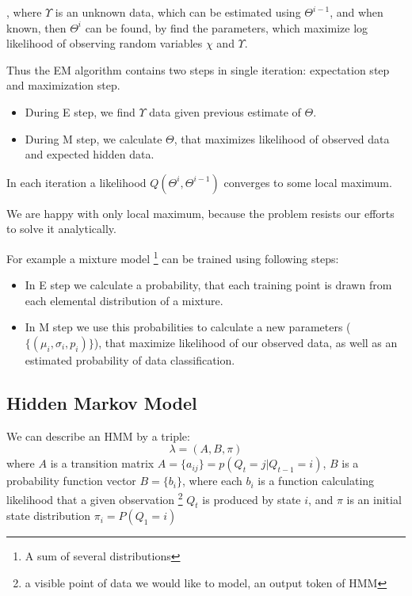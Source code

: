 \documentclass[12pt,a4paper,english]{article}
\begin{document}
 , where $\Upsilon$ is an unknown data, which can be estimated using $\Theta^{i-1}$, and when known, then $\Theta^{i}$ can be found, by find the parameters, which maximize log likelihood of observing random variables $\chi$ and $\Upsilon$. \newline


Thus the EM algorithm contains two steps in single iteration: \newline
    expectation step and maximization step. \newline
\begin{itemize}
	\item During E step, we find $\Upsilon$ data given previous estimate of $\Theta$.
	\item During M step, we calculate $\Theta$, that maximizes likelihood of observed data and expected hidden data.
\end{itemize}
In each iteration a likelihood $Q(\Theta^i,\Theta^{ i-1})$ converges to some local maximum. \newline

We are happy with only local maximum, because the problem resists our efforts to solve it analytically. \newline


For example a mixture model \footnote{A sum  of several distributions} can be trained using following steps: \newline
\begin{itemize}
    \item In E step we calculate a probability, that each training point is drawn from each elemental distribution of a mixture.
    \item In M step we use this probabilities to calculate a new parameters ($\{(\mu_i, \sigma_i, p_i)\}$), that maximize likelihood of our observed data, as well as an estimated probability of data classification.
\end{itemize}

\newpage
\subsection{Hidden Markov Model}

We can describe an HMM by a triple:
\begin{equation}
    \lambda=(A, B, \pi)
\end{equation}
 where $A$ is a transition matrix $A = \{ a_{ij} \} = p(Q_t=j | Q_{t-1}=i)$, \newline
 $B$ is a probability function vector $B = \{ b_i \}$, where each $b_i$ is a function calculating likelihood that a given observation \footnote{a visible point of data we would like to model, an output token of HMM} $Q_t$ is produced by state $i$, \newline
 and $\pi$ is an initial state distribution  $\pi_i=P(Q_1=i)$ \newline
\end{document}
